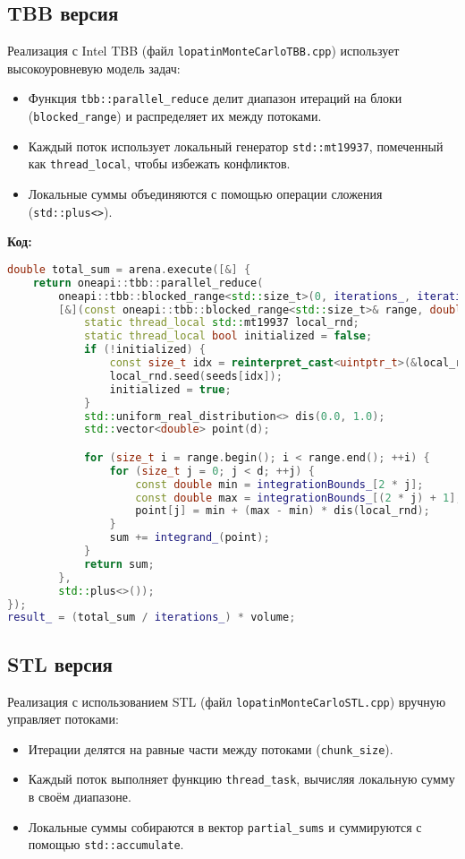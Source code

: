 \documentclass[12pt,a4paper]{extarticle}
\begin{document}
\subsection{TBB версия}
Реализация с Intel TBB (файл \texttt{lopatinMonteCarloTBB.cpp}) использует высокоуровневую модель задач:
\begin{itemize}
    \item Функция \texttt{tbb::parallel\_reduce} делит диапазон итераций на блоки (\texttt{blocked\_range}) и распределяет их между потоками.
    \item Каждый поток использует локальный генератор \texttt{std::mt19937}, помеченный как \texttt{thread\_local}, чтобы избежать конфликтов.
    \item Локальные суммы объединяются с помощью операции сложения (\texttt{std::plus<>}).
\end{itemize}

\textbf{Код:}
\begin{lstlisting}[language=C++]
double total_sum = arena.execute([&] {
    return oneapi::tbb::parallel_reduce(
        oneapi::tbb::blocked_range<std::size_t>(0, iterations_, iterations_ / arena.max_concurrency()), 0.0,
        [&](const oneapi::tbb::blocked_range<std::size_t>& range, double sum) {
            static thread_local std::mt19937 local_rnd;
            static thread_local bool initialized = false;
            if (!initialized) {
                const size_t idx = reinterpret_cast<uintptr_t>(&local_rnd) % num_threads;
                local_rnd.seed(seeds[idx]);
                initialized = true;
            }
            std::uniform_real_distribution<> dis(0.0, 1.0);
            std::vector<double> point(d);

            for (size_t i = range.begin(); i < range.end(); ++i) {
                for (size_t j = 0; j < d; ++j) {
                    const double min = integrationBounds_[2 * j];
                    const double max = integrationBounds_[(2 * j) + 1];
                    point[j] = min + (max - min) * dis(local_rnd);
                }
                sum += integrand_(point);
            }
            return sum;
        },
        std::plus<>());
});
result_ = (total_sum / iterations_) * volume;
\end{lstlisting}

\subsection{STL версия}
Реализация с использованием STL (файл \texttt{lopatinMonteCarloSTL.cpp}) вручную управляет потоками:
\begin{itemize}
    \item Итерации делятся на равные части между потоками (\texttt{chunk\_size}).
    \item Каждый поток выполняет функцию \texttt{thread\_task}, вычисляя локальную сумму в своём диапазоне.
    \item Локальные суммы собираются в вектор \texttt{partial\_sums} и суммируются с помощью \texttt{std::accumulate}.
\end{itemize}
\end{document}
